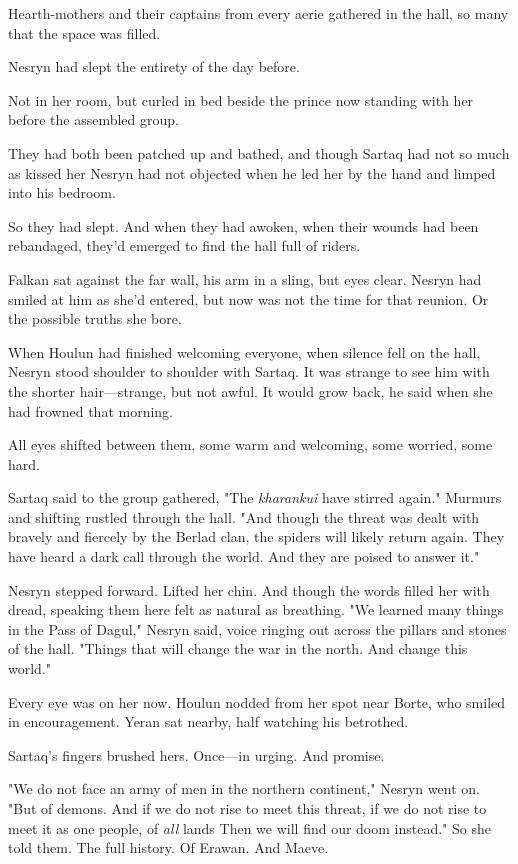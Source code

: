 Hearth-mothers and their captains from every aerie gathered in the hall, so many that the space was filled.

Nesryn had slept the entirety of the day before.

Not in her room, but curled in bed beside the prince now standing with her before the assembled group.

They had both been patched up and bathed, and though Sartaq had not so much as kissed her  Nesryn had not objected when he led her by the hand and limped into his bedroom.

So they had slept. And when they had awoken, when their wounds had been rebandaged, they'd emerged to find the hall full of riders.

Falkan sat against the far wall, his arm in a sling, but eyes clear. Nesryn had smiled at him as she'd entered, but now was not the time for that reunion. Or the possible truths she bore.

When Houlun had finished welcoming everyone, when silence fell on the hall, Nesryn stood shoulder to shoulder with Sartaq. It was strange to see him with the shorter hair---strange, but not awful. It would grow back, he said when she had frowned that morning.

All eyes shifted between them, some warm and welcoming, some worried, some hard.

Sartaq said to the group gathered, "The \emph{kharankui} have stirred again." Murmurs and shifting rustled through the hall. "And though the threat was dealt with bravely and fiercely by the Berlad clan, the spiders will likely return again. They have heard a dark call through the world. And they are poised to answer it."

Nesryn stepped forward. Lifted her chin. And though the words filled her with dread, speaking them here felt as natural as breathing. "We learned many things in the Pass of Dagul," Nesryn said, voice ringing out across the pillars and stones of the hall. "Things that will change the war in the north. And change this world."

Every eye was on her now. Houlun nodded from her spot near Borte, who smiled in encouragement. Yeran sat nearby, half watching his betrothed.

Sartaq's fingers brushed hers. Once---in urging. And promise.

"We do not face an army of men in the northern continent," Nesryn went on. "But of demons. And if we do not rise to meet this threat, if we do not rise to meet it as one people, of \emph{all} lands  Then we will find our doom instead." So she told them. The full history. Of Erawan. And Maeve.

